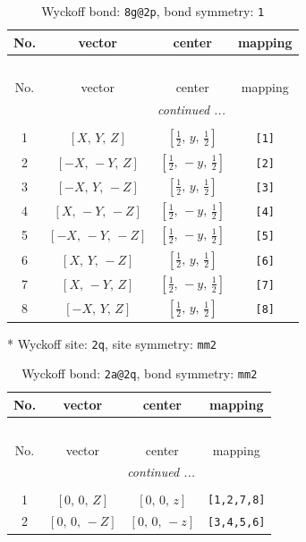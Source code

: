 \documentclass[fleqn,8pt]{jsarticle}
\begin{document}
\begin{longtable}{cccc}
\caption{Wyckoff bond: {\tt 8g@2p}, bond symmetry: {\tt 1}}
 \\
 \hline \hline
No. & vector & center & mapping \\ \hline \endfirsthead

\multicolumn{3}{l}{\tablename\ \thetable{}} \\
 \hline \hline
No. & vector & center & mapping \\ \hline \endhead

 \hline \hline
\multicolumn{3}{r}{\footnotesize\it continued ...} \\ \endfoot

 \hline \hline
\multicolumn{3}{r}{} \\ \endlastfoot

1 & $\left[ X,\, Y,\, Z \right]$ & $\left[ \frac{1}{2},\, y,\, \frac{1}{2} \right]$ & {\tt [1]} \\ \hline
2 & $\left[ - X,\, - Y,\, Z \right]$ & $\left[ \frac{1}{2},\, - y,\, \frac{1}{2} \right]$ & {\tt [2]} \\ \hline
3 & $\left[ - X,\, Y,\, - Z \right]$ & $\left[ \frac{1}{2},\, y,\, \frac{1}{2} \right]$ & {\tt [3]} \\ \hline
4 & $\left[ X,\, - Y,\, - Z \right]$ & $\left[ \frac{1}{2},\, - y,\, \frac{1}{2} \right]$ & {\tt [4]} \\ \hline
5 & $\left[ - X,\, - Y,\, - Z \right]$ & $\left[ \frac{1}{2},\, - y,\, \frac{1}{2} \right]$ & {\tt [5]} \\ \hline
6 & $\left[ X,\, Y,\, - Z \right]$ & $\left[ \frac{1}{2},\, y,\, \frac{1}{2} \right]$ & {\tt [6]} \\ \hline
7 & $\left[ X,\, - Y,\, Z \right]$ & $\left[ \frac{1}{2},\, - y,\, \frac{1}{2} \right]$ & {\tt [7]} \\ \hline
8 & $\left[ - X,\, Y,\, Z \right]$ & $\left[ \frac{1}{2},\, y,\, \frac{1}{2} \right]$ & {\tt [8]} \\
\end{longtable}
* Wyckoff site: {\tt 2q}, site symmetry: {\tt mm2}
\renewcommand{\arraystretch}{1.2}
\begin{longtable}{cccc}
\caption{Wyckoff bond: {\tt 2a@2q}, bond symmetry: {\tt mm2}}
 \\
 \hline \hline
No. & vector & center & mapping \\ \hline \endfirsthead

\multicolumn{3}{l}{\tablename\ \thetable{}} \\
 \hline \hline
No. & vector & center & mapping \\ \hline \endhead

 \hline \hline
\multicolumn{3}{r}{\footnotesize\it continued ...} \\ \endfoot

 \hline \hline
\multicolumn{3}{r}{} \\ \endlastfoot

1 & $\left[ 0,\, 0,\, Z \right]$ & $\left[ 0,\, 0,\, z \right]$ & {\tt [1,2,7,8]} \\ \hline
2 & $\left[ 0,\, 0,\, - Z \right]$ & $\left[ 0,\, 0,\, - z \right]$ & {\tt [3,4,5,6]} \\
\end{longtable}
\end{document}
